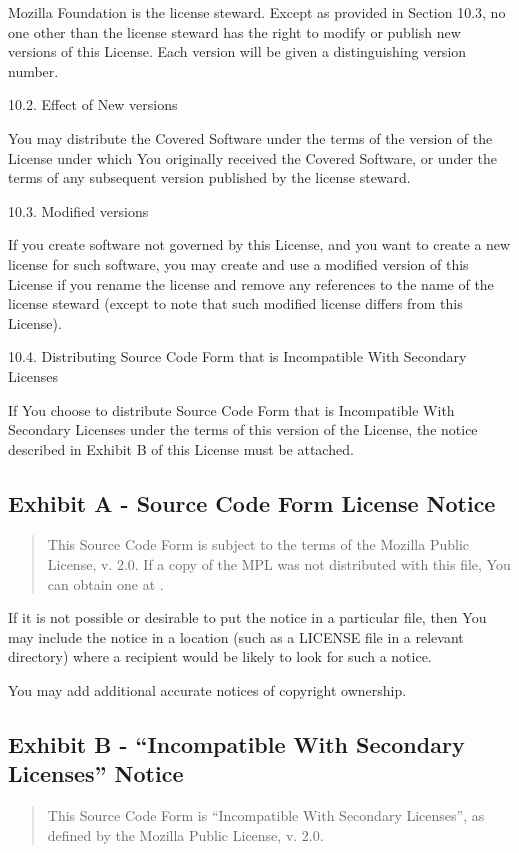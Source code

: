\documentclass[letterpaper,10pt,openany,oneside,english]{sphinxmanual}
\begin{document}
Mozilla Foundation is the license steward. Except as provided in Section
10.3, no one other than the license steward has the right to modify or
publish new versions of this License. Each version will be given a
distinguishing version number.

10.2. Effect of New versions

You may distribute the Covered Software under the terms of the version
of the License under which You originally received the Covered Software,
or under the terms of any subsequent version published by the license
steward.

10.3. Modified versions

If you create software not governed by this License, and you want to
create a new license for such software, you may create and use a
modified version of this License if you rename the license and remove
any references to the name of the license steward (except to note that
such modified license differs from this License).

10.4. Distributing Source Code Form that is Incompatible With Secondary
Licenses

If You choose to distribute Source Code Form that is Incompatible With
Secondary Licenses under the terms of this version of the License, the
notice described in Exhibit B of this License must be attached.


\subsection{Exhibit A - Source Code Form License Notice}
\label{\detokenize{warranty:exhibit-a-source-code-form-license-notice}}\begin{quote}

This Source Code Form is subject to the terms of the Mozilla Public
License, v. 2.0. If a copy of the MPL was not distributed with this
file, You can obtain one at .
\end{quote}

If it is not possible or desirable to put the notice in a particular
file, then You may include the notice in a location (such as a LICENSE
file in a relevant directory) where a recipient would be likely to look
for such a notice.

You may add additional accurate notices of copyright ownership.


\subsection{Exhibit B - “Incompatible With Secondary Licenses” Notice}
\label{\detokenize{warranty:exhibit-b-incompatible-with-secondary-licenses-notice}}\begin{quote}

This Source Code Form is “Incompatible With Secondary Licenses”, as
defined by the Mozilla Public License, v. 2.0.
\end{quote}
\end{document}
